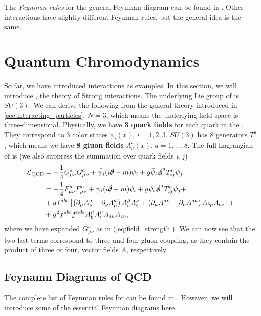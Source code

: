 The \emph{Feynman rules} for the general \QED Feynman diagram can be found in \cite{intro_to_part}.
Other interactions have slightly different Feynman rules, but the general idea is the same.


\section{Quantum Chromodynamics}
\label{sec:QCD}
So far, we have introduced \QED interactions as examples. 
In this section, we will introduce \QCD, the theory of Strong interactions.
The underlying Lie group of \QCD is  $SU(3)$.
We can derive the following from the general theory introduced in \cref{sec:interacting_particles}. 
$N=3$, which means the underlying field space is three-dimensional.
Physically, we have \textbf{3 quark fields} for each quark in the \SM.
They correspond to 3 color states $\psi_i(x)$, $i=1,2,3$.
$SU(3)$ has 8 generators $T^a$, which means we have \textbf{8 gluon fields} $A^a_\mu(x)$, $a=1,\dots, 8$.
The full Lagrangian of \QCD is \cite{qcd} (we also suppress the summation over quark fields $i,j$)
\begin{align}
\begin{split}
    \label{eq:qcd_lag}
    \mathcal{L}_{\text{QCD}}  &= - \frac{1}{4}  G^a_{\mu\nu} G^a_{\mu\nu}  + \bar{\psi}_i (i \slashed{\partial} - m ) \psi_i + g \bar{\psi}_i \slashed{A}^a T^a_{ij} \psi_j \\
     &= - \frac{1}{4}  F^a_{\mu\nu} F^a_{\mu\nu}  + \bar{\psi}_i (i \slashed{\partial} - m ) \psi_i + g \bar{\psi}_i \slashed{A}^a T^a_{ij} \psi_j + \\    
     &+ g f^{a b c}\left[\left(\partial_\mu A_\nu^a-\partial_\nu A_\mu^a\right) A_b^\mu A_c^\nu+\left(\partial_\mu A^{a\nu}-\partial_\nu A^{a \mu}\right) A_{b \mu} A_{c \nu}\right] + \\
     &+ g^2 f^{a b c} f^{a d e} A_b^\mu A_c^\nu A_{d \mu} A_{e \nu},
\end{split}
\end{align}
where we have expanded $G^a_{\mu\nu}$ as in (\ref{eq:field_strength}). 
We can now see that the two last terms correspond to three and four-gluon coupling, as they contain the product of three or four, vector fields $A$, respectively.


\subsection{Feynamn Diagrams of QCD}
The complete list of Feynman rules for \QCD can be found in \cite{qcd}.
However, we will introduce some of the essential Feynman diagrams here.

